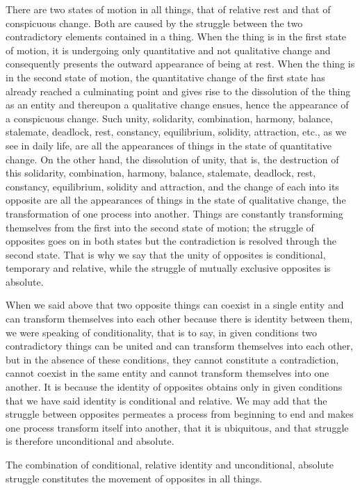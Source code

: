 \documentclass{article}
\begin{document}
There are two states of motion in all things, that of relative rest and that of
conspicuous change. Both are caused by the struggle between the two
contradictory elements contained in a thing. When the thing is in the first
state of motion, it is undergoing only quantitative and not qualitative change
and consequently presents the outward appearance of being at rest. When the
thing is in the second state of motion, the quantitative change of the first
state has already reached a culminating point and gives rise to the dissolution
of the thing as an entity and thereupon a qualitative change ensues, hence the
appearance of a conspicuous change. Such unity, solidarity, combination,
harmony, balance, stalemate, deadlock, rest, constancy, equilibrium, solidity,
attraction, etc., as we see in daily life, are all the appearances of things in
the state of quantitative change. On the other hand, the dissolution of unity,
that is, the destruction of this solidarity, combination, harmony, balance,
stalemate, deadlock, rest, constancy, equilibrium, solidity and attraction, and
the change of each into its opposite are all the appearances of things in the
state of qualitative change, the transformation of one process into another.
Things are constantly transforming themselves from the first into the second
state of motion; the struggle of opposites goes on in both states but the
contradiction is resolved through the second state. That is why we say that the
unity of opposites is conditional, temporary and relative, while the struggle
of mutually exclusive opposites is absolute.

When we said above that two opposite things can coexist in a single entity and
can transform themselves into each other because there is identity between
them, we were speaking of conditionality, that is to say, in given conditions
two contradictory things can be united and can transform themselves into each
other, but in the absence of these conditions, they cannot constitute
a contradiction, cannot coexist in the same entity and cannot transform
themselves into one another. It is because the identity of opposites obtains
only in given conditions that we have said identity is conditional and
relative. We may add that the struggle between opposites permeates a process
from beginning to end and makes one process transform itself into another, that
it is ubiquitous, and that struggle is therefore unconditional and absolute.

The combination of conditional, relative identity and unconditional, absolute
struggle constitutes the movement of opposites in all things.
\end{document}
